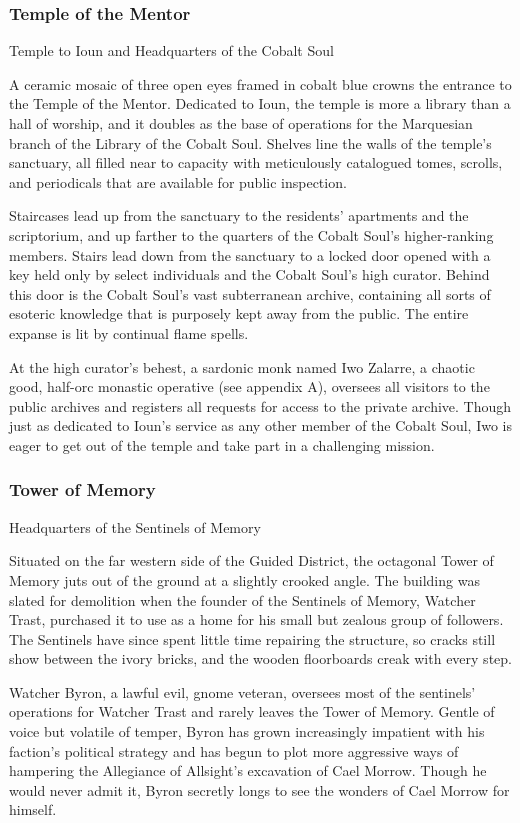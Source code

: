 \documentclass[10pt,a4paper,twoside,bg=print,twocolumn,openany,nodeprecatedcode]{dndbook}
\begin{document}
\subsubsection{Temple of the Mentor}
Temple to Ioun and Headquarters of the Cobalt Soul

A ceramic mosaic of three open eyes framed in cobalt blue crowns the entrance to the Temple of the Mentor. Dedicated to Ioun, the temple is more a library than a hall of worship, and it doubles as the base of operations for the Marquesian branch of the Library of the Cobalt Soul. Shelves line the walls of the temple's sanctuary, all filled near to capacity with meticulously catalogued tomes, scrolls, and periodicals that are available for public inspection.

Staircases lead up from the sanctuary to the residents' apartments and the scriptorium, and up farther to the quarters of the Cobalt Soul's higher-ranking members. Stairs lead down from the sanctuary to a locked door opened with a key held only by select individuals and the Cobalt Soul's high curator. Behind this door is the Cobalt Soul's vast subterranean archive, containing all sorts of esoteric knowledge that is purposely kept away from the public. The entire expanse is lit by continual flame spells.

At the high curator's behest, a sardonic monk named Iwo Zalarre, a chaotic good, half-orc monastic operative (see appendix A), oversees all visitors to the public archives and registers all requests for access to the private archive. Though just as dedicated to Ioun's service as any other member of the Cobalt Soul, Iwo is eager to get out of the temple and take part in a challenging mission.

\subsubsection{Tower of Memory}
Headquarters of the Sentinels of Memory

Situated on the far western side of the Guided District, the octagonal Tower of Memory juts out of the ground at a slightly crooked angle. The building was slated for demolition when the founder of the Sentinels of Memory, Watcher Trast, purchased it to use as a home for his small but zealous group of followers. The Sentinels have since spent little time repairing the structure, so cracks still show between the ivory bricks, and the wooden floorboards creak with every step.

Watcher Byron, a lawful evil, gnome veteran, oversees most of the sentinels' operations for Watcher Trast and rarely leaves the Tower of Memory. Gentle of voice but volatile of temper, Byron has grown increasingly impatient with his faction's political strategy and has begun to plot more aggressive ways of hampering the Allegiance of Allsight's excavation of Cael Morrow. Though he would never admit it, Byron secretly longs to see the wonders of Cael Morrow for himself.
\end{document}
